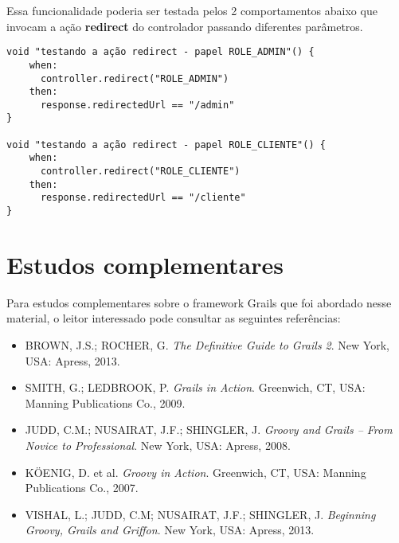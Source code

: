 \vspace{0.2cm}

Essa  funcionalidade  poderia ser  testada  pelos  2  comportamentos abaixo  que
invocam a ação {\bf redirect} do controlador passando diferentes parâmetros. 

\vspace{0.2cm}

\begin{mdframed}
\begin{footnotesize}
\begin{verbatim}
void "testando a ação redirect - papel ROLE_ADMIN"() {
    when:
      controller.redirect("ROLE_ADMIN")
    then:
      response.redirectedUrl == "/admin"
}

void "testando a ação redirect - papel ROLE_CLIENTE"() {
    when:
      controller.redirect("ROLE_CLIENTE")
    then:
      response.redirectedUrl == "/cliente"
}
\end{verbatim}
\end{footnotesize}
\end{mdframed}

\section{Estudos complementares}

\vspace{0.5cm}

Para  estudos complementares  sobre o  framework Grails  que foi  abordado nesse
material, o leitor interessado pode consultar as seguintes referências:

\begin{itemize}

\vspace{0.5cm}

\item  {BROWN, J.S.; ROCHER,  G. \emph{The  Definitive Guide  to Grails  2}. New
  York, USA: Apress, 2013.} 

\vspace{0.5cm}

\item  {SMITH, G.;  LEDBROOK, P.  \emph{Grails in  Action}. Greenwich,  CT, USA:
  Manning Publications Co., 2009.} 

\vspace{0.5cm}

\item {JUDD, C.M.; NUSAIRAT, J.F.;  SHINGLER, J. \emph{Groovy and Grails -- From
    Novice to Professional}. New York, USA: Apress, 2008.}  

\vspace{0.5cm}

\item  {K{\"O}ENIG, D.  et  al.  \emph{Groovy in  Action}.  Greenwich, CT,  USA:
  Manning Publications Co., 2007.}

\vspace{0.5cm}

\item  {VISHAL, L.;  JUDD,  C.M; NUSAIRAT,  J.F.;  SHINGLER, J.  \emph{Beginning
    Groovy, Grails and Griffon}. New York, USA: Apress, 2013.}

\end{itemize}
